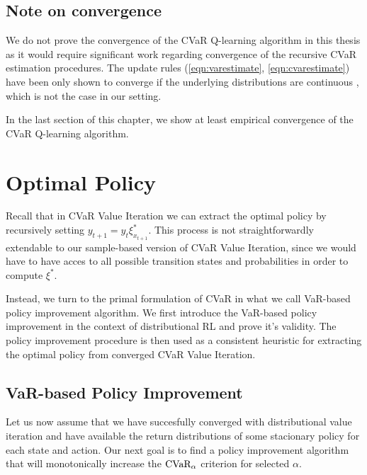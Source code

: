 \subsection{Note on convergence}
We do not prove the convergence of the CVaR Q-learning algorithm in this thesis as it would require significant work regarding convergence of the recursive CVaR estimation procedures. The update rules (\ref{eqn:varestimate}, \ref{eqn:cvarestimate})  have been only shown to converge if the underlying distributions are continuous \citep{bardou2009recursive}, which is not the case in our setting.


In the last section of this chapter, we show at least empirical convergence of the CVaR Q-learning algorithm.



\section{Optimal Policy}\label{sec:qpolicy}

Recall that in CVaR Value Iteration we can extract the optimal policy by recursively setting $y_{t+1}=y_t \xi^*_{x_{t+1}}$. This process is not straightforwardly extendable to our sample-based version of CVaR Value Iteration, since we would have to have acces to all possible transition states and probabilities in order to compute $\xi^*$.

Instead, we turn to the primal formulation of CVaR in what we call VaR-based policy improvement algorithm. We first introduce the VaR-based policy improvement in the context of distributional RL and prove it's validity. The policy improvement procedure is then used as a consistent heuristic for extracting the optimal policy from converged CVaR Value Iteration.


\subsection{VaR-based Policy Improvement}

Let us now assume that we have succesfully converged with distributional value iteration and have available the return distributions of some stacionary policy for each state and action. Our next goal is to find a policy improvement algorithm that will monotonically increase the $\text{CVaR}_\alpha$ criterion for selected $\alpha$.

